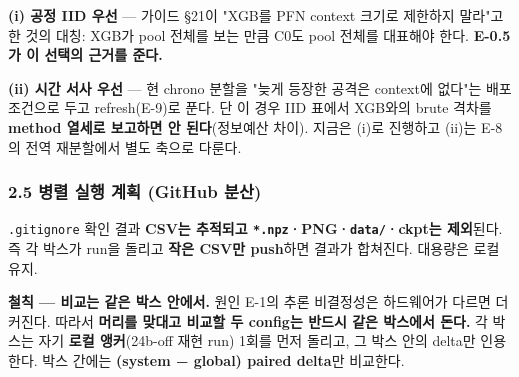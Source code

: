 \par\noindent \textbullet\enspace \textbf{(i) 공정 IID 우선} — 가이드 §21이 "XGB를 PFN context 크기로 제한하지 말라"고 한 것의 대칭: XGB가 pool 전체를 보는 만큼 C0도 pool 전체를 대표해야 한다. \textbf{E-0.5가 이 선택의 근거를 준다.}


\par\noindent \textbullet\enspace \textbf{(ii) 시간 서사 우선} — 현 chrono 분할을 "늦게 등장한 공격은 context에 없다"는 배포 조건으로 두고 refresh(E-9)로 푼다. 단 이 경우 IID 표에서 XGB와의 brute 격차를 \textbf{method 열세로 보고하면 안 된다}(정보예산 차이). 지금은 (i)로 진행하고 (ii)는 E-8의 전역 재분할에서 별도 축으로 다룬다.


\subsubsection{2.5 병렬 실행 계획 (GitHub 분산)}
\texttt{.\allowbreak{}gitigno\allowbreak{}re} 확인 결과 \textbf{CSV는 추적되고 \texttt{*.\allowbreak{}npz}·PNG·\texttt{data/\allowbreak{}\allowbreak{}}·ckpt는 제외}된다. 즉 각 박스가 run을 돌리고 \textbf{작은 CSV만 push}하면 결과가 합쳐진다. 대용량은 로컬 유지.

\textbf{철칙 — 비교는 같은 박스 안에서.} 원인 E-1의 추론 비결정성은 하드웨어가 다르면 더 커진다. 따라서 \textbf{머리를 맞대고 비교할 두 config는 반드시 같은 박스에서 돈다.} 각 박스는 자기 \textbf{로컬 앵커}(24b-off 재현 run) 1회를 먼저 돌리고, 그 박스 안의 delta만 인용한다. 박스 간에는 \textbf{(system − global) paired delta}만 비교한다.

